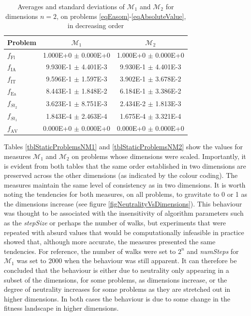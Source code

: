 \documentclass[conference]{IEEEtran}
\begin{document}
\begin{table}[!t] 
	\renewcommand{\arraystretch}{1.3}
	\caption{Averages and standard deviations of ${\mathcal{M}_1}$ and ${\mathcal{M}_2}$ for dimensions $n = 2$, on problems \ref{eqEasom}-\ref{eqAbsoluteValue}, in decreasing order}
	\label{tblStaticProblems2}
	\centering
	\begin{tabular}{|l|c|c|}
		\hline
		\textbf{Problem}					& ${\mathcal{M}_1}$ & ${\mathcal{M}_2}$ \\ \hline				
		$f_{\text{Fl}}$			& 1.000E+0 $\pm$ 0.000E+0 & 1.000E+0 $\pm$ 0.000E+0 \\
		$f_{\text{IA}}$			& 9.930E-1 $\pm$ 4.401E-3 & 9.930E-1 $\pm$ 4.401E-3 \\
		$f_{\text{IT}}$ 		& 9.596E-1 $\pm$ 1.597E-3 & 3.902E-1 $\pm$ 3.678E-2 \\
		$f_{\text{Ea}}$ 		& 8.443E-1 $\pm$ 1.848E-2 & 6.184E-1 $\pm$ 3.386E-2 \\
		$f_{\textit{St}_2}$ 	& 3.623E-1 $\pm$ 8.751E-3 & 2.434E-2 $\pm$ 1.813E-3 \\
		$f_{\textit{St}_1}$ 	& 1.843E-4 $\pm$ 2.463E-4 & 1.675E-4 $\pm$ 3.321E-4 \\
		$f_{\text{AV}}$			& 0.000E+0 $\pm$ 0.000E+0 & 0.000E+0 $\pm$ 0.000E+0 \\  \hline		
	\end{tabular}
\end{table}

Tables \ref{tblStaticProblemsNM1} and \ref{tblStaticProblemsNM2} show the values for measures ${\mathcal{M}_1}$ and ${\mathcal{M}_2}$ on problems whose dimensions were scaled. Importantly, it is evident from both tables that the same order established in two dimensions are preserved across the other dimensions (as indicated by the colour coding). The measures maintain the same level of consistency as in two dimensions. It is worth noting the tendencies for both measures, on all problems, to gravitate to 0 or 1 as the dimensions increase (see figure \ref{figNeutralityVsDimensions}). This behaviour was thought to be associated with the insensitivity of algorithm parameters such as the \textit{stepSize} or perhaps the number of walks, but experiments that were repeated with absurd values that would be computationally infeasible in practice showed that, although more accurate, the measures presented the same tendencies. For reference, the number of walks were set to $2^n$ and \textit{numSteps} for ${\mathcal{M}_1}$ was set to 2000 when the behaviour was still apparent. It can therefore be concluded that the behaviour is either due to neutrality only appearing in a subset of the dimensions, for some problems, as dimensions increase, or the degree of neutrality increases for some problems as they are stretched out in higher dimensions. In both cases the behaviour is due to some change in the fitness landscape in higher dimensions.
\end{document}
